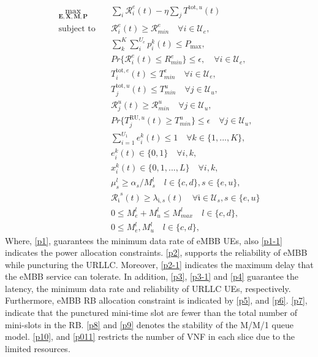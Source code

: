 \documentclass[conference]{IEEEtran}
\begin{document}
\begin{subequations} \label{mainP}
\begin{alignat}{4}
\max\limits_{ \boldsymbol{E}, \boldsymbol{X},\boldsymbol{M}, \boldsymbol{P} } &  \sum_i {\mathcal{R}}_{i}^e(t) - \eta \sum_j T^{\text{tot}, u}(t)       \ \\
\text{subject to} \quad  & {\mathcal{R}}_{i}^e(t) \geq  \mathcal{R}_{min}^e \quad \forall i \in \mathcal{U}_e, \label{p1} \\
& \sum_k^K \sum_i^{U_e} p^k_i(t) \leq P_{\text{max}},  \label{p1-1} \\ 
& Pr\{{\mathcal{R}}_{i}^e(t) \leq {R}_{min}^e\}  \leq \epsilon,\quad \forall i \in \mathcal{U}_e, \label{p2}\\
&T^{\text{tot}, e}_i(t)  \leq T_{min}^e  \quad \forall i \in \mathcal{U}_e, \label{p2-1} \\
&T^{\text{tot}, u}_j(t)  \leq T_{min}^u  \quad \forall j \in \mathcal{U}_u, \label{p3} \\
& {\mathcal{R}}_{j}^u(t) \geq  \mathcal{R}_{min}^u \quad \forall j \in \mathcal{U}_u, \label{p3-1} \\
&Pr\{T^{\text{RU}, u}_j(t) \geq T_{min}^u\} \leq \epsilon  \quad \forall j \in \mathcal{U}_u, \label{p4} \\
&\sum_{i=1}^{U_1}e^k_i(t)\leq 1 \quad \forall k \in \{1,...,K\},\label{p5} \\
&e^k_i(t)\in \{0,1\}  \quad \forall i,k, \label{p6} \\
& x^k_i(t)\in \{0,1,...,L\}  \quad \forall i,k, \label{p7} \\
& \mu^l_s \geq \alpha_s/M^l_s \quad l \in \{c,d\}, s\in\{e,u\}, \label{p8} \\
& {\mathcal{R}_{\mathfrak{i}}}^s(t) \geq {\lambda}_{\mathfrak{i},s}(t) \quad \forall \mathfrak{i} \in \mathcal{U}_s, s\in \{e,u\}\label{p9} \\
& 0 \leq M^l_e  + M^l_u \leq M_{max}^l  \quad l \in \{c,d\},\label{p10}\\
& 0 \leq M^l_e, M^l_u  \quad l \in \{c,d\},\label{p011}
\end{alignat}
\label{constraints}
\end{subequations}
Where, \eqref{p1}, guarantees the minimum data rate of eMBB UEs, also \eqref{p1-1} indicates the power allocation constraints.
\eqref{p2}, supports the reliability of eMBB while puncturing the URLLC. Moreover, \eqref{p2-1} indicates the maximum delay that the eMBB service can tolerate.
In addition, \eqref{p3}, \eqref{p3-1} and \eqref{p4} guarantee the latency, the minimum data rate and reliability of URLLC UEs, respectively.
Furthermore, eMBB RB allocation constraint is indicated by \eqref{p5}, and \eqref{p6}.
\eqref{p7}, indicate that the punctured mini-time slot are fewer than the total number of mini-slots in the RB.
\eqref{p8} and \eqref{p9} denotes the stability of the M/M/1 queue model.
\eqref{p10}, and \eqref{p011} restricts the number of VNF in each slice due to the limited resources.
\end{document}
